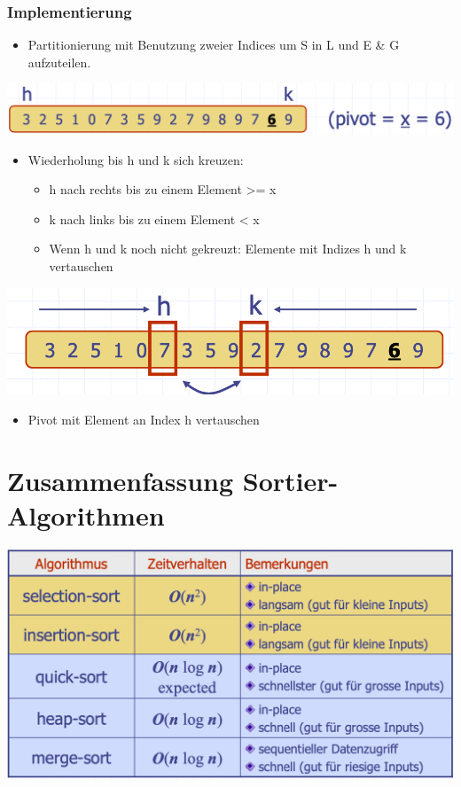 \subsubsection{Implementierung}
\begin{itemize}
    \item Partitionierung mit Benutzung zweier Indices um S in L und E \& G aufzuteilen.
\end{itemize}
\begin{center}
    \includegraphics[scale=.2]{graphic/05 QuickSort/In-Place1.png}
\end{center}
\begin{itemize}
    \item Wiederholung bis h und k sich kreuzen:
    \begin{itemize}
        \item h nach rechts bis zu einem Element >= x
        \item k nach links bis zu einem Element < x
        \item Wenn h und k noch nicht gekreuzt: Elemente mit Indizes h und k vertauschen
    \end{itemize}
\end{itemize}
\vspace{-8pt}
\begin{center}
    \includegraphics[scale=.2]{graphic/05 QuickSort/In-Place2.png}
\end{center}
\vspace{-8pt}
\begin{itemize}
    \item Pivot mit Element an Index h vertauschen
\end{itemize}


\section{Zusammenfassung Sortier-Algorithmen}
\begin{center}
    \includegraphics[scale=.25]{graphic/05 QuickSort/zfsg.png}
\end{center}
\vspace{-8pt}

